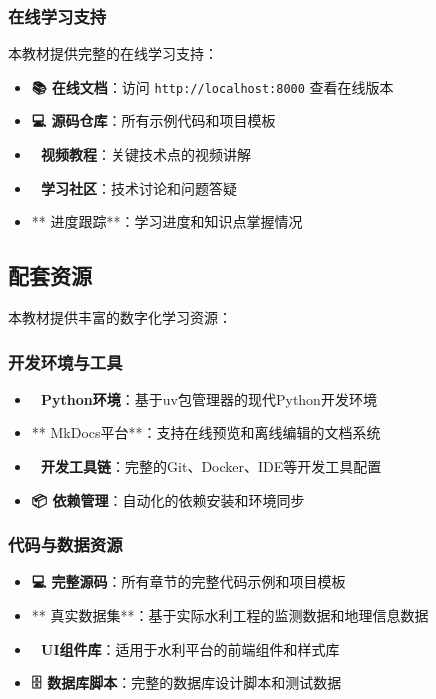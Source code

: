 \subsubsection{在线学习支持}\label{ux5728ux7ebfux5b66ux4e60ux652fux6301}

本教材提供完整的在线学习支持：

\begin{itemize}
\tightlist
\item
  \textbf{📚 在线文档}：访问 \texttt{http://localhost:8000} 查看在线版本
\item
  \textbf{💻 源码仓库}：所有示例代码和项目模板
\item
  \textbf{🎥 视频教程}：关键技术点的视频讲解\\
\item
  \textbf{💬 学习社区}：技术讨论和问题答疑
\item
  ** 进度跟踪**：学习进度和知识点掌握情况
\end{itemize}

\subsection{配套资源}\label{ux914dux5957ux8d44ux6e90}

本教材提供丰富的数字化学习资源：

\subsubsection{开发环境与工具}\label{ux5f00ux53d1ux73afux5883ux4e0eux5de5ux5177}

\begin{itemize}
\tightlist
\item
  \textbf{🐍 Python环境}：基于uv包管理器的现代Python开发环境
\item
  ** MkDocs平台**：支持在线预览和离线编辑的文档系统
\item
  \textbf{🔧 开发工具链}：完整的Git、Docker、IDE等开发工具配置
\item
  \textbf{📦 依赖管理}：自动化的依赖安装和环境同步
\end{itemize}

\subsubsection{代码与数据资源}\label{ux4ee3ux7801ux4e0eux6570ux636eux8d44ux6e90}

\begin{itemize}
\tightlist
\item
  \textbf{💻 完整源码}：所有章节的完整代码示例和项目模板
\item
  ** 真实数据集**：基于实际水利工程的监测数据和地理信息数据
\item
  \textbf{🎨 UI组件库}：适用于水利平台的前端组件和样式库
\item
  \textbf{🗄 数据库脚本}：完整的数据库设计脚本和测试数据
\end{itemize}

